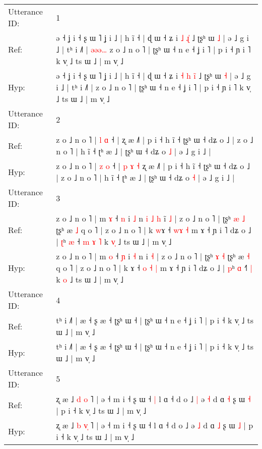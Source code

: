 \documentclass[10pt]{article}
\DeclareRobustCommand{\hl}[1]{{\textcolor{red}{#1}}}
\begin{document}
\begin{longtable}{ll}
\toprule
Utterance ID: & 1 \\
Ref: & ə ˧ ʝ i ˧ ʂ ɯ ˥ ʝ i ˩ | h ĩ ˧ | ɖ ɯ ˧ ʑ i\hl{}\hl{} \hl{˩} \hl{ɻ}\hl{̍} ˩ ʈʂʰ ɯ \hl{˩} | ə ˩ g i ˩ | tʰ i ˩˥ |\hl{ }\hl{ə}\hl{ə}\hl{ə}\hl{…} z o ˩ n o ˥ | ʈʂʰ ɯ ˧ n e ˧ ʝ i ˥ | p i ˧ ɲ i ˥ k v̩ ˩ ts ɯ ˩ | m v̩ ˩
 \\
Hyp: & ə ˧ ʝ i ˧ ʂ ɯ ˥ ʝ i ˩ | h ĩ ˧ | ɖ ɯ ˧ ʑ i\hl{ }\hl{˧} \hl{h} \hl{i}\hl{̃} ˩ ʈʂʰ ɯ \hl{˧} | ə ˩ g i ˩ | tʰ i ˩˥ |\hl{}\hl{}\hl{}\hl{}\hl{} z o ˩ n o ˥ | ʈʂʰ ɯ ˧ n e ˧ ʝ i ˥ | p i ˧ ɲ i ˥ k v̩ ˩ ts ɯ ˩ | m v̩ ˩
 \\
\midrule
Utterance ID: & 2 \\
Ref: & z o ˩ n o ˥ | \hl{l} \hl{ɑ} ˧ |\hl{}\hl{}\hl{}\hl{}\hl{}\hl{} ʐ æ ˩˥ | p i ˧ h ĩ ˧ ʈʂʰ ɯ ˧ dʑ o ˩ | z o ˩ n o ˥ | h ĩ ˧ ʈʰ æ ˩ | ʈʂʰ ɯ ˧ dʑ o \hl{˩} | ə ˩ g i ˩ |
 \\
Hyp: & z o ˩ n o ˥ | \hl{z} \hl{o} ˧ |\hl{ }\hl{p}\hl{ }\hl{ɤ}\hl{ }\hl{˧} ʐ æ ˩˥ | p i ˧ h ĩ ˧ ʈʂʰ ɯ ˧ dʑ o ˩ | z o ˩ n o ˥ | h ĩ ˧ ʈʰ æ ˩ | ʈʂʰ ɯ ˧ dʑ o \hl{˧} | ə ˩ g i ˩ |
 \\
\midrule
Utterance ID: & 3 \\
Ref: & z o ˩ n o ˥ | m \hl{ɤ} ˧ \hl{n} i \hl{˩} n\hl{ }\hl{i}\hl{ }\hl{˩}\hl{ }\hl{h} i\hl{̃} \hl{˩} | z o ˩ n o ˥ | ʈʂʰ \hl{æ} \hl{˩} ʈʂʰ æ \hl{˩} q o ˥ | z o ˩ n o ˥ | k \hl{w}ɤ ˧ \hl{}\hl{w}\hl{ɤ} \hl{˧} m ɤ ˧ ɲ i ˥ dʑ o ˩ | \hl{ʈ}ʰ \hl{æ} ˧\hl{ }\hl{m}\hl{ }\hl{ɤ} \hl{˥} k \hl{v}\hl{̩} ˩ ts ɯ ˩ | m v̩ ˩
 \\
Hyp: & z o ˩ n o ˥ | m \hl{o} ˧ \hl{ɲ} i \hl{˧} n\hl{}\hl{}\hl{}\hl{}\hl{}\hl{} i\hl{} \hl{˧} | z o ˩ n o ˥ | ʈʂʰ \hl{ɤ} \hl{˧} ʈʂʰ æ \hl{˧} q o ˥ | z o ˩ n o ˥ | k \hl{}ɤ ˧ \hl{o}\hl{ }\hl{˧} \hl{|} m ɤ ˧ ɲ i ˥ dʑ o ˩ | \hl{p}ʰ \hl{ɑ} ˧\hl{}\hl{}\hl{}\hl{˥} \hl{|} k \hl{}\hl{o} ˩ ts ɯ ˩ | m v̩ ˩
 \\
\midrule
Utterance ID: & 4 \\
Ref: & tʰ i ˩˥ | æ ˧ ʂ æ ˧ ʈʂʰ ɯ ˧ | ʈʂʰ ɯ ˧ n e ˧ ʝ i ˥ | p i ˧ k v̩ ˩ ts ɯ ˩ | m v̩ ˩
 \\
Hyp: & tʰ i ˩˥ | æ ˧ ʂ æ ˧ ʈʂʰ ɯ ˧ | ʈʂʰ ɯ ˧ n e ˧ ʝ i ˥ | p i ˧ k v̩ ˩ ts ɯ ˩ | m v̩ ˩
 \\
\midrule
Utterance ID: & 5 \\
Ref: & ʐ æ ˩ \hl{d} \hl{}\hl{o} ˥ | ə ˧ m i ˧ ʂ ɯ ˧\hl{ }\hl{|} l ɑ ˧ d o ˩\hl{ }\hl{|} ə \hl{˧} d ɑ \hl{˧} ʂ ɯ \hl{˧} | p i ˧ k v̩ ˩ ts ɯ ˩ | m v̩ ˩
 \\
Hyp: & ʐ æ ˩ \hl{b} \hl{v}\hl{̩} ˥ | ə ˧ m i ˧ ʂ ɯ ˧\hl{}\hl{} l ɑ ˧ d o ˩\hl{}\hl{} ə \hl{˩} d ɑ \hl{˩} ʂ ɯ \hl{˩} | p i ˧ k v̩ ˩ ts ɯ ˩ | m v̩ ˩

\end{longtable}
\end{document}
